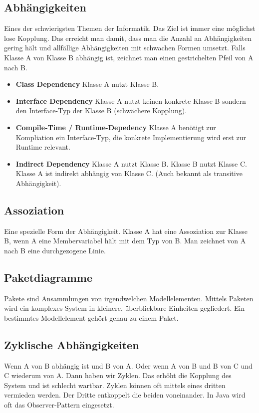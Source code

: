 \subsection{Abhängigkeiten}
Eines der schwierigsten Themen der Informatik. Das Ziel ist immer eine möglichst lose Kopplung. Das erreicht man damit, dass man die Anzahl an Abhängigkeiten gering hält und allfällige Abhängigkeiten mit schwachen Formen umsetzt. Falls Klasse A von Klasse B abhängig ist, zeichnet man einen gestrichelten Pfeil von A nach B.

\begin{itemize}
	\item \textbf{Class Dependency} Klasse A nutzt Klasse B.
	\item \textbf{Interface Dependency} Klasse A nutzt keinen konkrete Klasse B sondern den Interface-Typ der Klasse B (schwächere Kopplung).
	\item \textbf{Compile-Time / Runtime-Depedency} Klasse A benötigt zur Kompliation ein Interface-Typ, die konkrete Implementierung wird erst zur Runtime relevant.
	\item \textbf{Indirect Dependency} Klasse A nutzt Klasse B. Klasse B nutzt Klasse C. Klasse A ist indirekt abhängig von Klasse C. (Auch bekannt als transitive Abhängigkeit).
\end{itemize}

\subsection{Assoziation}
Eine spezielle Form der Abhängigkeit. Klasse A hat eine Assoziation zur Klasse B, wenn A eine Membervariabel hält mit dem Typ von B. Man zeichnet von A nach B eine durchgezogene Linie.

\subsection{Paketdiagramme}
Pakete sind Ansammlungen von irgendwelchen Modellelementen. Mittels Paketen wird ein komplexes System in kleinere, überblickbare Einheiten gegliedert. Ein bestimmtes Modellelement gehört genau zu einem Paket.

\subsection{Zyklische Abhängigkeiten}
Wenn A von B abhängig ist und B von A. Oder wenn A von B und B von C und C wiederum von A. Dann haben wir Zyklen. Das erhöht die Kopplung des System und ist schlecht wartbar. Zyklen können oft mittels eines dritten vermieden werden. Der Dritte entkoppelt die beiden voneinander. In Java wird oft das Observer-Pattern eingesetzt. %

